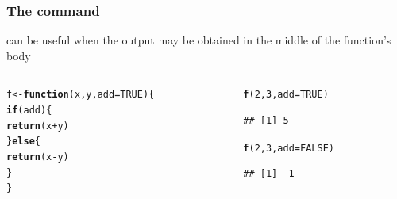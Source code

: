 \documentclass[12pt]{beamer}\usepackage[]{graphicx}\usepackage[]{color}
\makeatletter
\newcommand{\hlnum}[1]{\textcolor[rgb]{0.686,0.059,0.569}{#1}}%
\newcommand{\hlopt}[1]{\textcolor[rgb]{0,0,0}{#1}}%
\newcommand{\hlstd}[1]{\textcolor[rgb]{0.345,0.345,0.345}{#1}}%
\newcommand{\hlkwa}[1]{\textcolor[rgb]{0.161,0.373,0.58}{\textbf{#1}}}%
\newcommand{\hlkwb}[1]{\textcolor[rgb]{0.69,0.353,0.396}{#1}}%
\newcommand{\hlkwc}[1]{\textcolor[rgb]{0.333,0.667,0.333}{#1}}%
\newcommand{\hlkwd}[1]{\textcolor[rgb]{0.737,0.353,0.396}{\textbf{#1}}}%
\newenvironment{kframe}{%
 \def\at@end@of@kframe{}%
 \ifinner\ifhmode%
  \def\at@end@of@kframe{\end{minipage}}%
  \begin{minipage}{\columnwidth}%
 \fi\fi%
 \def\FrameCommand##1{\hskip\@totalleftmargin \hskip-\fboxsep
 \colorbox{shadecolor}{##1}\hskip-\fboxsep
     \hskip-\linewidth \hskip-\@totalleftmargin \hskip\columnwidth}%
 \MakeFramed {\advance\hsize-\width
   \@totalleftmargin\z@ \linewidth\hsize
   \@setminipage}}%
 {\par\unskip\endMakeFramed%
 \at@end@of@kframe}
\newenvironment{knitrout}{}{} %
\makeatother
\begin{document}
\begin{frame}[fragile]
\frametitle{The  command}

 can be useful when the output may be obtained in the middle of the function's body

\begin{columns}[t]
\begin{column}{0.55\textwidth}
\begin{knitrout}\footnotesize
{}\color{fgcolor}\begin{kframe}
\begin{alltt}
\hlstd{f} \hlkwb{<-} \hlkwa{function}\hlstd{(}\hlkwc{x}\hlstd{,} \hlkwc{y}\hlstd{,} \hlkwc{add} \hlstd{=} \hlnum{TRUE}\hlstd{) \{}
  \hlkwa{if} \hlstd{(add) \{}
    \hlkwd{return}\hlstd{(x} \hlopt{+} \hlstd{y)}
  \hlstd{\}} \hlkwa{else} \hlstd{\{}
    \hlkwd{return}\hlstd{(x} \hlopt{-} \hlstd{y)}
  \hlstd{\}}
\hlstd{\}}
\end{alltt}
\end{kframe}
\end{knitrout}
\end{column}

\begin{column}{0.35\textwidth}
\begin{knitrout}\footnotesize
{}\color{fgcolor}\begin{kframe}
\begin{alltt}
\hlkwd{f}\hlstd{(}\hlnum{2}\hlstd{,} \hlnum{3}\hlstd{,} \hlkwc{add} \hlstd{=} \hlnum{TRUE}\hlstd{)}
\end{alltt}
\begin{verbatim}
## [1] 5
\end{verbatim}
\begin{alltt}
\hlkwd{f}\hlstd{(}\hlnum{2}\hlstd{,} \hlnum{3}\hlstd{,} \hlkwc{add} \hlstd{=} \hlnum{FALSE}\hlstd{)}
\end{alltt}
\begin{verbatim}
## [1] -1
\end{verbatim}
\end{kframe}
\end{knitrout}
\end{column}
\end{columns}

\end{frame}

\end{document}
